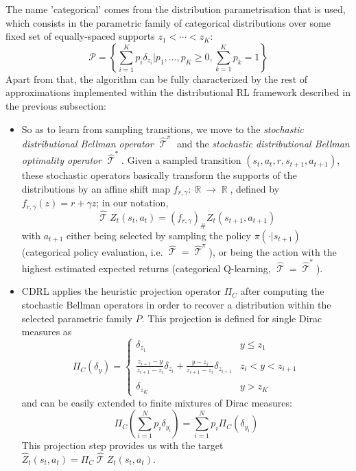 \documentclass[12pt,a4paper,openright,twoside]{article}
\DeclareMathOperator*{\R}{\mathbb{R}}
\DeclareMathOperator*{\T}{\mathcal{T}}
\numberwithin{equation}{section}
\theoremstyle{definition}
\theoremstyle{remark}
\theoremstyle{plain}
\begin{document}
The name 'categorical' comes from the distribution parametrisation that is used, which consists in the parametric family of categorical distributions over some fixed set of equally-spaced supports $z_1 < \cdots < z_K$:
\begin{equation}
	\mathcal{P} = \left\{ \sum_{i=1}^{K} p_i \delta_{z_i} \Big| p_1, \dots , p_K \geq 0, \sum_{k=1}^{K} p_k = 1 \right\}
\end{equation}
Apart from that, the algorithm can be fully characterized by the rest of approximations implemented within the distributional RL framework described in the previous subsection:
\begin{itemize}
	\item So as to learn from sampling transitions, we move to the \textit{stochastic distributional Bellman operator} $\widehat{\T}^\pi$ and the \textit{stochastic distributional Bellman optimality operator} $\widehat{\T}^*$. Given a sampled transition $(s_t,a_t,r,s_{t+1},a_{t+1})$, these stochastic operators basically transform the supports of the distributions by an affine shift map $f_{r,\gamma} : \R \rightarrow \R$, defined by $f_{r,\gamma}(z) = r + \gamma z$; in our notation, 
		$$\widehat{\T} Z_t(s_t,a_t) = (f_{r,\gamma})_\# Z_t(s_{t+1},a_{t+1})$$
		with $a_{t+1}$ either being selected by sampling the policy $\pi(\cdot | s_{t+1})$  (categorical policy evaluation, i.e. $\widehat{\T}=\widehat{\T}^\pi$), or being the action with the highest estimated expected returns (categorical Q-learning, $\widehat{\T}=\widehat{\T}^*$).
		
	\item CDRL applies the heuristic projection operator $\Pi_C$ after computing the stochastic Bellman operators in order to recover a distribution within the selected parametric family $P$. This projection is defined for single Dirac measures as
	\begin{equation} \label{heuristicProjectionOp}
		\Pi_C (\delta_y) = \left\{
		\begin{array}{ll}
			\delta_{z_1} & y\leq z_1 \\
			\\ \frac{z_{i+1} -y}{z_{i+1}-z_i} \delta_{z_i} + \frac{y-z_i}{z_{i+1}-z_i} \delta_{z_{i+1}} & z_i < y < z_{i+1} \\
			\\ \delta_{z_K} & y>z_K
		\end{array}
		\right.
	\end{equation}
	and can be easily extended to finite mixtures of Dirac measures: 
	$$ \Pi_C \left( \sum_{i=1}^{N} p_i \delta_{y_i} \right) = \sum_{i=1}^{N} p_i \Pi_C ( \delta_{y_i} )	$$
	This projection step provides us with the target $\widehat{Z}_t (s_t,a_t) = \Pi_{C} \widehat{\T} Z_t(s_t,a_t)$. 
	

\end{itemize}
\end{document}
